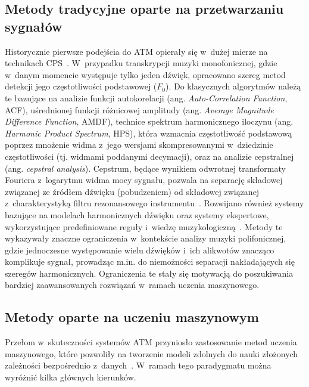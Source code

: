 \subsection{Metody tradycyjne oparte na przetwarzaniu sygnałów}
\label{ssec:tradycyjne_metody_cps}

Historycznie pierwsze podejścia do ATM opierały się w~dużej mierze na technikach CPS~\autocite{KlapuriDavy2006SignalProcessing}. W~przypadku transkrypcji muzyki monofonicznej, gdzie w~danym momencie występuje tylko jeden dźwięk, opracowano szereg metod detekcji jego częstotliwości podstawowej ($F_0$). Do klasycznych algorytmów należą te bazujące na analizie funkcji autokorelacji (ang. \textit{Auto-Correlation Function}, ACF), uśrednionej funkcji różnicowej amplitudy (ang. \textit{Average Magnitude Difference Function}, AMDF), technice spektrum harmonicznego iloczynu (ang. \textit{Harmonic Product Spectrum}, HPS), która wzmacnia częstotliwość podstawową poprzez mnożenie widma z~jego wersjami skompresowanymi w~dziedzinie częstotliwości (tj. widmami poddanymi decymacji), oraz na analizie cepstralnej (ang. \textit{cepstral analysis}). Cepstrum, będące wynikiem odwrotnej transformaty Fouriera z~logarytmu widma mocy sygnału, pozwala na separację składowej związanej ze źródłem dźwięku (pobudzeniem) od składowej związanej z~charakterystyką filtru rezonansowego instrumentu~\autocite{KlapuriDavy2006SignalProcessing}. Rozwijano również systemy bazujące na modelach harmonicznych dźwięku oraz systemy ekspertowe, wykorzystujące predefiniowane reguły i~wiedzę muzykologiczną~\autocite{KlapuriDavy2006SignalProcessing}. Metody te wykazywały znaczne ograniczenia w~kontekście analizy muzyki polifonicznej, gdzie jednoczesne występowanie wielu dźwięków i~ich alikwotów znacząco komplikuje sygnał, prowadząc m.in. do niemożności separacji nakładających się szeregów harmonicznych. Ograniczenia te stały się motywacją do poszukiwania bardziej zaawansowanych rozwiązań w~ramach uczenia maszynowego.

\subsection{Metody oparte na uczeniu maszynowym}
\label{ssec:metody_uczenia_maszynowego_atm}

Przełom w~skuteczności systemów ATM przyniosło zastosowanie metod uczenia maszynowego, które pozwoliły na tworzenie modeli zdolnych do nauki złożonych zależności bezpośrednio z~danych~\autocite{Jamshidi2024SurveyAMT,BurletHindle2017IsolatedGuitarTranscription}. W~ramach tego paradygmatu można wyróżnić kilka głównych kierunków.

